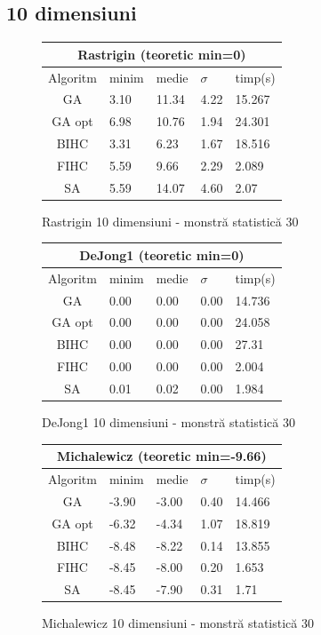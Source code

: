\documentclass{article}
\begin{document}
\subsection{10 dimensiuni}


\begin{figure}[!h]
\begin{tabular}{||c|||l|l|l|l||}
  \hline
  \multicolumn{5}{||c||}{Rastrigin (teoretic min=0)} \\ \hline
  Algoritm & minim & medie & $\sigma$ & timp(s) \\ \hline \hline
  GA & 3.10 & 11.34 & 4.22 & 15.267 \\ \hline
  GA opt & 6.98 & 10.76 & 1.94 & 24.301 \\ \hline
  BIHC & 3.31 & 6.23 & 1.67 & 18.516\\ \hline
  FIHC & 5.59 & 9.66 & 2.29 & 2.089 \\ \hline
  SA & 5.59 & 14.07 & 4.60 & 2.07 \\ \hline
\end{tabular}
\caption{Rastrigin 10 dimensiuni - monstră statistică 30} 
\end{figure}

\begin{figure}[!h]
\begin{tabular}{||c|||l|l|l|l||}
  \hline
  \multicolumn{5}{||c||}{DeJong1 (teoretic min=0)} \\ \hline
  Algoritm & minim & medie & $\sigma$ & timp(s) \\ \hline \hline
  GA & 0.00 & 0.00 & 0.00 & 14.736 \\ \hline
  GA opt & 0.00 & 0.00 & 0.00 & 24.058 \\ \hline
  BIHC & 0.00 & 0.00 & 0.00 & 27.31\\ \hline
  FIHC & 0.00 & 0.00 & 0.00 & 2.004 \\ \hline
  SA & 0.01 & 0.02 & 0.00 & 1.984 \\ \hline
\end{tabular}
\caption{DeJong1 10 dimensiuni - monstră statistică 30} 
\end{figure}

\begin{figure}[!h]
\begin{tabular}{||c|||l|l|l|l||}
  \hline
  \multicolumn{5}{||c||}{Michalewicz (teoretic min=-9.66)} \\ \hline
  Algoritm & minim & medie & $\sigma$ & timp(s) \\ \hline \hline
  GA & -3.90 & -3.00 & 0.40 & 14.466 \\ \hline
  GA opt & -6.32 & -4.34 & 1.07 & 18.819 \\ \hline
  BIHC & -8.48 & -8.22 & 0.14 & 13.855\\ \hline
  FIHC & -8.45 & -8.00 & 0.20 & 1.653 \\ \hline
  SA & -8.45 & -7.90 & 0.31 & 1.71 \\ \hline
\end{tabular}
\caption{Michalewicz 10 dimensiuni - monstră statistică 30} 
\end{figure}
\end{document}
